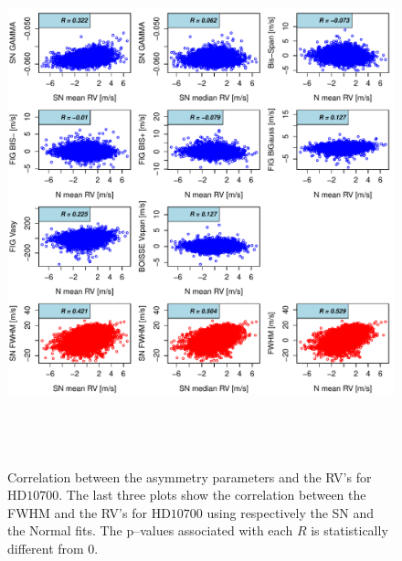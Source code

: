 \documentclass{aa}
\begin{document}
\begin{figure}[htbp]
\begin{center}
\includegraphics[height = 6in]{HD10700_[4]Comparison_para.pdf}  
   \caption{Correlation between the asymmetry parameters and the RV's for $\text{HD}10700$. The last three plots show the correlation between the FWHM and the RV's for $\text{HD}10700$ using respectively the SN and the Normal fits. The p--values associated with each $R$ is statistically different from $0$.}
   \label{fig:Tau:corrPlot}
\end{center}
\end{figure}
\end{document}
